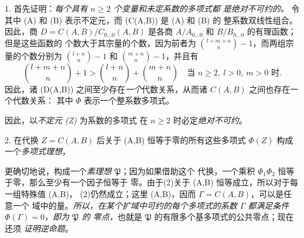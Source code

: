 1. 首先证明：\emph{每个具有 \(n\ge2\) 个变量和未定系数的多项式都
是绝对不可约的。} 令
其中 (A) 和 (B) 表示不定元，而 (C(A,B)) 是 (A) 和 (B) 的
整系数双线性组合。因此，商
\(D=C(A,B)/C_{0\ldots0}(A,B)\) 是各商
\(A/A_{0\ldots0}\) 和 \(B/B_{0\ldots0}\) 的有理函数；但是这些函数的
个数大于其宗量的个数，因为前者为
\(\binom{l+m+n}{n}-1\)，而两组宗量的个数分别为
\(\binom{l+n}{n}-1\) 和 \(\binom{m+n}{n}-1\)，并且有
\[
\binom{l+m+n}{n}+1>
\binom{l+n}{n}+\binom{m+n}{n}
\quad\text{当 } n\ge2,\ l>0,\ m>0\text{ 时}.
\]
因此，诸 (D(A,B)) 之间至少存在\emph{一个}代数关系，从而诸
\(C(A,B)\) 之间也存在一个代数关系：
其中 \(\Phi\) 表示一个整系数多项式。

因此，以\emph{不定元 (Z)} 为系数的多项式
在 \(n\ge2\) 时必定\emph{绝对不可约}。
\addtocounter{footnote}{1}

2. 在代换 \(Z=C(A,B)\) 后关于 (A,B) 恒等于零的所有这些多项式
\(\Phi(Z)\) 构成一个\emph{多项式理想}，
\addtocounter{footnote}{1}
更确切地说，构成一个\emph{素理想 \(\mathfrak P\)}；因为如果借助这个
代换，一个乘积 \(\Phi_1\Phi_2\) 恒等于零，那么至少有一个因子恒等于
零。由于(2)关于 (A,B) 恒等成立，所以对于每一组特殊值 (A,B)，
(2)仍然成立；这里 (A,B)，因而 \(\Gamma=C(A,B)\)，可以是任意一个
域中的量。\emph{所以，在某个扩域中可约的每个多项式的系数
\(\Gamma\) 都满足条件 \(\Phi(\Gamma)=0\)，即为 \(\mathfrak P\) 的
零点，}也就是 \(\mathfrak P\) 的有限多个基多项式的公共零点；现在还须
\emph{证明逆命题}。

